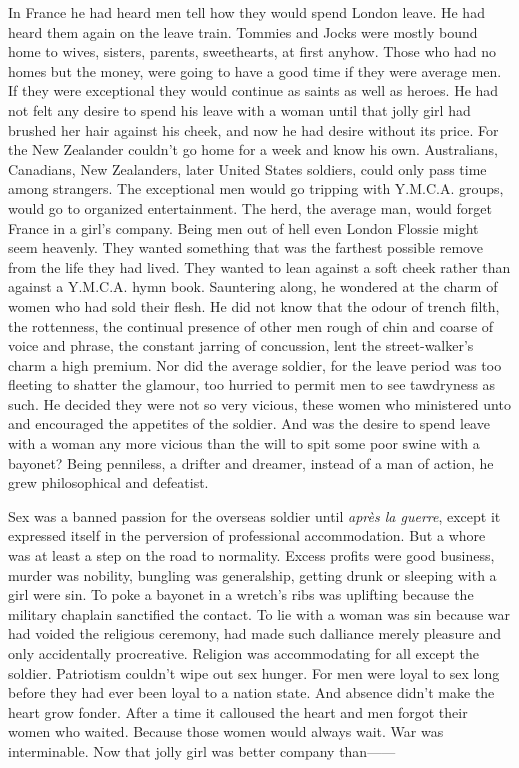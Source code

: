 In France he had heard men tell how they would spend London leave. He had heard them again on the leave train. Tommies and Jocks were mostly bound home to wives, sisters, parents, sweethearts, at first anyhow. Those who had no homes but the money, were going to have a good time if they were average men. If they were exceptional they would continue as saints as well as heroes. He had not felt any desire to spend his leave with a woman until that jolly girl had brushed her hair against his cheek, and now he had desire without its price. For the New Zealander couldn't go home for a week and know his own. Australians, Canadians, New Zealanders, later United States soldiers, could only pass time among strangers. The exceptional men would go tripping with Y.M.C.A. groups, would go to organized entertainment. The herd, the average man, would forget France in a girl's company. Being men out of hell even London Flossie might seem heavenly. They wanted something that was the farthest possible remove from the life they had lived. They wanted to lean against a soft cheek rather than against a Y.M.C.A. hymn book. Sauntering along, he wondered at the charm of women who had sold their flesh. He did not know that the odour of trench filth, the rottenness, the continual presence of other men rough of chin and coarse of voice and phrase, the constant jarring of concussion, lent the street-walker's charm a high premium. Nor did the average soldier, for the leave period was too fleeting to shatter the glamour, too hurried to permit men to see tawdryness as such. He decided they were not so very vicious, these women who ministered unto and encouraged the appetites of the soldier. And was the desire to spend leave with a woman any more vicious than the will to spit some poor swine with a bayonet? Being penniless, a drifter and dreamer, instead of a man of action, he grew philosophical and defeatist.

Sex was a banned passion for the overseas soldier until \emph{apr\`{e}s la guerre}, except it expressed itself in the perversion of professional accommodation. But a whore was at least a step on the road to normality. Excess profits were good business, murder was nobility, bungling was generalship, getting drunk or sleeping with a girl were sin. To poke a bayonet in a wretch's ribs was uplifting because the military chaplain sanctified the contact. To lie with a woman was sin because war had voided the religious ceremony, had made such dalliance merely pleasure and only accidentally procreative. Religion was accommodating for all except the soldier. Patriotism couldn't wipe out sex hunger. For men were loyal to sex long before they had ever been loyal to a nation state. And absence didn't make the heart grow fonder. After a time it calloused the heart and men forgot their women who waited. Because those women would always wait. War was interminable. Now that jolly girl was better company than------


